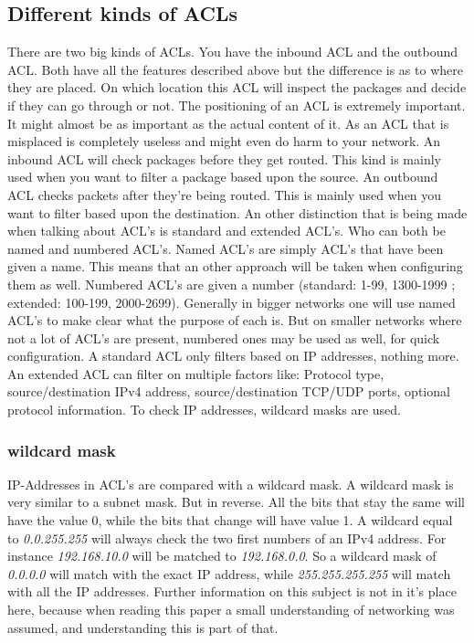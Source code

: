  \subsection{Different kinds of ACLs}
 There are two big kinds of ACLs. You have the inbound ACL and the outbound ACL. Both have all the features described above but the difference is as to where they are placed. On which location this ACL will inspect the packages and decide if they can go through or not.
 The positioning of an ACL is extremely important. It might almost be as important as the actual content of it. As an ACL that is misplaced is completely useless and might even do harm to your network.
 An inbound ACL will check packages before they get routed. This kind is mainly used when you want to filter a package based upon the source.
 An outbound ACL checks packets after they're being routed. This is mainly used when you want to filter based upon the destination.
 An other distinction that is being made when talking about ACL's is standard and extended ACL's. Who can both be named and numbered ACL's. Named ACL's are simply ACL's that have been given a name. This means that an other approach will be taken when configuring them as well. Numbered ACL's are given a number (standard: 1-99, 1300-1999 ; extended: 100-199, 2000-2699). Generally in bigger networks one will use named ACL's to make clear what the purpose of each is. But on smaller networks where not a lot of ACL's are present, numbered ones may be used as well, for quick configuration. A standard ACL only filters based on IP addresses, nothing more. An extended ACL can filter on multiple factors like: Protocol type, source/destination IPv4 address, source/destination TCP/UDP ports, optional protocol information. To check IP addresses, wildcard masks are used.
 \subsubsection{wildcard mask}
 IP-Addresses in ACL's are compared with a wildcard mask. A wildcard mask is very similar to a subnet mask. But in reverse. All the bits that stay the same will have the value 0, while the bits that change will have value 1. A wildcard equal to \textit{0.0.255.255} will always check the two first numbers of an IPv4 address. For instance \textit{192.168.10.0} will be matched to  \textit{192.168.0.0}. So a wildcard mask of \textit{0.0.0.0} will match with the exact IP address, while \textit{255.255.255.255} will match with all the IP addresses.  Further information on this subject is not in it's place here, because when reading this paper a small understanding of networking was assumed, and understanding this is part of that.
